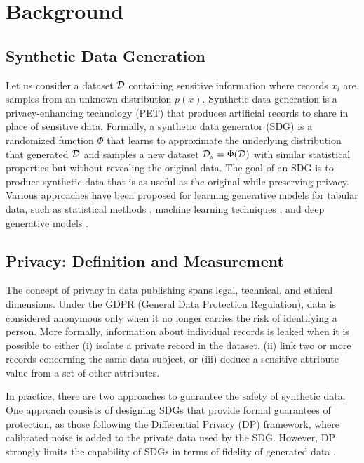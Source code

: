 \section{Background}

\subsection{Synthetic Data Generation}
Let us consider a dataset $\mathcal{D}$ containing sensitive information where records $x_i$ are samples from an unknown distribution $p(x)$.
Synthetic data generation is a privacy-enhancing technology (PET) that produces artificial records to share in place of sensitive data. Formally, a synthetic data generator (SDG) is a randomized function $\Phi$ that learns to approximate the underlying distribution that generated $\mathcal{D}$ and samples a new dataset $\mathcal{D}_s = \Phi(\mathcal{D})$ with similar statistical properties but without revealing the original data.
The goal of an SDG is to produce synthetic data that is as useful as the original while preserving privacy.
Various approaches have been proposed for learning generative models for tabular data, such as statistical methods \citep{patki2016synthetic, zhang2017privbayes}, machine learning techniques \citep{nowok2016synthpop, watson2023adversarial}, and deep generative models \citep{kotelnikov2023tabddpm, xu2019modeling, lee2022differentially}.

\subsection{Privacy: Definition and Measurement}
The concept of privacy in data publishing spans legal, technical, and ethical dimensions. Under the GDPR (General Data Protection Regulation), data is considered anonymous only when it no longer carries the risk of identifying a person. More formally, information about individual records is leaked when it is possible to either (i) isolate a private record in the dataset, (ii) link two or more records concerning the same data subject, or (iii) deduce a sensitive attribute value from a set of other attributes.

In practice, there are two approaches to guarantee the safety of synthetic data.
One approach consists of designing SDGs that provide formal guarantees of protection, as those following the Differential Privacy (DP) \citep{dwork2006differential} framework, where calibrated noise is added to the private data used by the SDG. However, DP strongly limits the capability of SDGs in terms of fidelity of generated data \citep{adams2025fidelity, stadler2022synthetic}.

